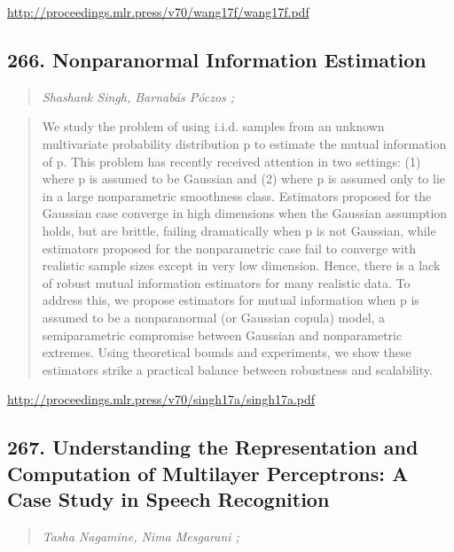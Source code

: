 \documentclass{article}
\begin{document}
\href{http://proceedings.mlr.press/v70/wang17f/wang17f.pdf}{http://proceedings.mlr.press/v70/wang17f/wang17f.pdf}

\subsection{266. Nonparanormal Information Estimation}

\begin{quote}
\footnotesize{\textit{Shashank Singh, Barnabás Póczos ;}}
\end{quote}

\begin{quote}
    We study the problem of using i.i.d. samples from an unknown multivariate probability distribution p to estimate the mutual information of p. This problem has recently received attention in two settings: (1) where p is assumed to be Gaussian and (2) where p is assumed only to lie in a large nonparametric smoothness class. Estimators proposed for the Gaussian case converge in high dimensions when the Gaussian assumption holds, but are brittle, failing dramatically when p is not Gaussian, while estimators proposed for the nonparametric case fail to converge with realistic sample sizes except in very low dimension. Hence, there is a lack of robust mutual information estimators for many realistic data. To address this, we propose estimators for mutual information when p is assumed to be a nonparanormal (or Gaussian copula) model, a semiparametric compromise between Gaussian and nonparametric extremes. Using theoretical bounds and experiments, we show these estimators strike a practical balance between robustness and scalability.  \end{quote}

\href{http://proceedings.mlr.press/v70/singh17a/singh17a.pdf}{http://proceedings.mlr.press/v70/singh17a/singh17a.pdf}

\subsection{267. Understanding the Representation and Computation of Multilayer Perceptrons: A Case Study in Speech Recognition}

\begin{quote}
\footnotesize{\textit{Tasha Nagamine, Nima Mesgarani ;}}
\end{quote}
\end{document}

